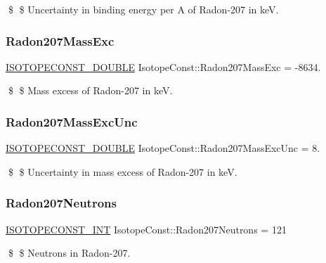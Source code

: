 \$ \$ Uncertainty in binding energy per A of Radon-\/207 in keV. \mbox{\label{group___isotope_const-_radon-_rn207_gac71129d286199b200ed4a5227380ec6f}} 
\subsubsection{\texorpdfstring{Radon207\+Mass\+Exc}{Radon207MassExc}}
{\footnotesize\ttfamily \mbox{\hyperlink{group___isotope_const-_macros_ga8f45a7272ce02c0b4c65c44636ed719a}{I\+S\+O\+T\+O\+P\+E\+C\+O\+N\+S\+T\+\_\+\+D\+O\+U\+B\+LE}} Isotope\+Const\+::\+Radon207\+Mass\+Exc = -\/8634.}

\$ \$ Mass excess of Radon-\/207 in keV. \mbox{\label{group___isotope_const-_radon-_rn207_ga829d953e88ff404eeceac436b948b30d}} 
\subsubsection{\texorpdfstring{Radon207\+Mass\+Exc\+Unc}{Radon207MassExcUnc}}
{\footnotesize\ttfamily \mbox{\hyperlink{group___isotope_const-_macros_ga8f45a7272ce02c0b4c65c44636ed719a}{I\+S\+O\+T\+O\+P\+E\+C\+O\+N\+S\+T\+\_\+\+D\+O\+U\+B\+LE}} Isotope\+Const\+::\+Radon207\+Mass\+Exc\+Unc = 8.}

\$ \$ Uncertainty in mass excess of Radon-\/207 in keV. \mbox{\label{group___isotope_const-_radon-_rn207_gaeb16e4ba0950d90cd9ba2e5ae74949fc}} 
\subsubsection{\texorpdfstring{Radon207\+Neutrons}{Radon207Neutrons}}
{\footnotesize\ttfamily \mbox{\hyperlink{group___isotope_const-_macros_ga5f18360b3e99483a35c32d789e62621c}{I\+S\+O\+T\+O\+P\+E\+C\+O\+N\+S\+T\+\_\+\+I\+NT}} Isotope\+Const\+::\+Radon207\+Neutrons = 121}

\$ \$ Neutrons in Radon-\/207. \mbox{\label{group___isotope_const-_radon-_rn207_gad86ea53e7e1dce0b2d1b3f172e707173}} 
